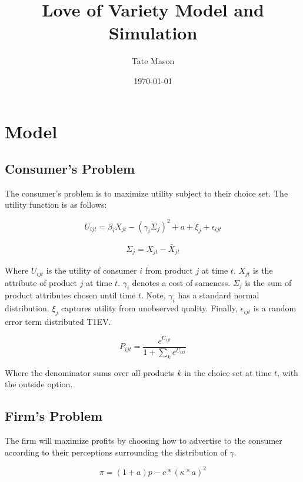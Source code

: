 \documentclass[11pt]{article}
\title{Love of Variety Model and Simulation}
\author{Tate Mason}
\date{\today}
\theoremstyle{definition}
\theoremstyle{remark}
\begin{document}
\maketitle
\thispagestyle{empty}


\newpage
\setcounter{page}{1}

\section{Model}

\subsection{Consumer's Problem}
The consumer's problem is to maximize utility subject to their choice set. The utility function is as follows:

\begin{equation}
  U_{ijt} = \beta_i X_{jt} - (\gamma_{i}\Sigma_j)^2 + a + \xi_j + \epsilon_{ijt}
\end{equation}

\begin{gather*}
  \Sigma_j = X_{jt} - \bar{X}_{jt}
\end{gather*}

Where $U_{ijt}$ is the utility of consumer $i$ from product $j$ at time $t$. $X_{jt}$ is the attribute of product $j$ at time $t$.  $\gamma_{i}$ denotes 
a cost of sameness. $\Sigma_j$ is the sum of product attributes chosen until time $t$. Note, $\gamma_i$ has a standard normal distribution. 
$\xi_j$ captures utility from unobserved quality. Finally, $\epsilon_{ijt}$ is a  random error term distributed T1EV.

\begin{equation}
  P_{ijt} = \frac{e^{U_{ijt}}}{1 + \sum_{k} e^{U_{ikt}}}
\end{equation}

Where the denominator sums over all products $k$ in the choice set at time $t$, with the outside option.

\subsection{Firm's Problem}
The firm will maximize profits by choosing how to advertise to the consumer according to their perceptions surrounding the distribution of $\gamma$.

\begin{equation}
  \pi = (1 + a)p - c*(\kappa*a)^2
\end{equation}
\end{document}

